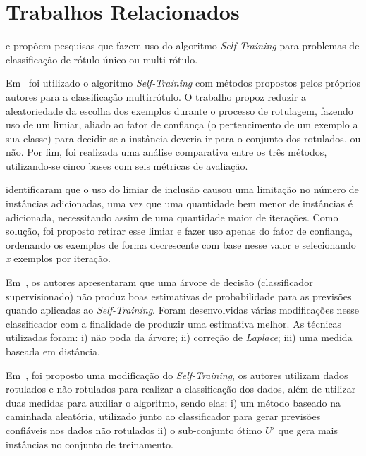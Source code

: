 \section{Trabalhos Relacionados}
    \label{sec:related-works}
    
     e  propõem pesquisas que fazem uso do algoritmo \textit{Self\hyp{Training}} para problemas de classificação de rótulo único ou multi\hyp{rótulo}.
    
    Em~ foi utilizado o algoritmo \textit{Self\hyp{Training}} com métodos propostos pelos próprios autores para a classificação multirrótulo. O trabalho propoz reduzir a aleatoriedade da escolha dos exemplos durante o processo de rotulagem, fazendo uso de um limiar, aliado ao fator de confiança (o pertencimento de um exemplo a sua classe) para decidir se a instância deveria ir para o conjunto dos rotulados, ou não. Por fim, foi realizada uma análise comparativa entre os três métodos, utilizando\hyp{se} cinco bases com seis métricas de avaliação. 
    
     identificaram que o uso do limiar de inclusão causou uma limitação no número de instâncias adicionadas, uma vez que uma quantidade bem menor de instâncias é adicionada, necessitando assim de uma quantidade maior de iterações. Como solução, foi proposto retirar esse limiar e fazer uso apenas do fator de confiança, ordenando os exemplos de forma decrescente com base nesse valor e selecionando \textit{x} exemplos por iteração.
    
    Em~, os autores apresentaram que uma árvore de decisão (classificador supervisionado) não produz boas estimativas de probabilidade para as previsões quando aplicadas ao \textit{Self\hyp{Training}}. Foram desenvolvidas várias modificações nesse classificador com a finalidade de produzir uma estimativa melhor. As técnicas utilizadas foram: i) não poda da árvore; ii) correção de \textit{Laplace}; iii) uma medida baseada em distância. 
    
    Em~, foi proposto uma modificação do \textit{Self\hyp{Training}}, os autores utilizam dados rotulados e não rotulados para realizar a classificação dos dados, além de utilizar duas medidas para auxiliar o algoritmo, sendo elas: i) um método baseado na caminhada aleatória, utilizado junto ao classificador para gerar previsões confiáveis nos dados não rotulados ii) o sub\hyp{conjunto} ótimo $U'$ que gera mais instâncias no conjunto de treinamento.
    
